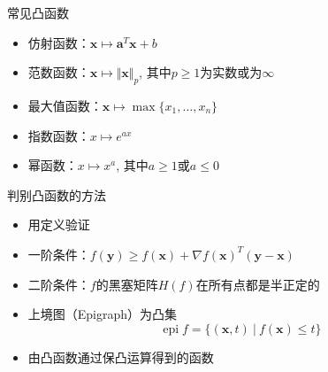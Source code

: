 
\begin{frame}

\begin{block}{常见凸函数}
\begin{itemize}
\item 仿射函数：$\mathbf{x} \mapsto \mathbf{a}^T\mathbf{x} + b$
\item 范数函数：$\mathbf{x} \mapsto \Vert \mathbf{x} \Vert_p$, 其中$p\ge1$为实数或为$\infty$
\item 最大值函数：$\mathbf{x} \mapsto \max\{x_1,\ldots,x_n\}$
\item 指数函数：$x \mapsto e^{ax}$
\item 幂函数：$x \mapsto x^{a}$, 其中$a \ge 1$或$a\le 0$
\end{itemize}
\end{block}

\end{frame}


\begin{frame}

\begin{block}{判别凸函数的方法}
\begin{itemize}
\item 用定义验证
\item 一阶条件：$f(\mathbf{y}) \ge f(\mathbf{x}) + \nabla f(\mathbf{x})^T(\mathbf{y} - \mathbf{x})$
\item 二阶条件：$f$的黑塞矩阵$H(f)$在所有点都是半正定的
\item 上境图（Epigraph）为凸集
$$\operatorname{epi}f = \{ (\mathbf{x}, t) \ |\ f(\mathbf{x}) \le t \}$$
\item 由凸函数通过保凸运算得到的函数
\end{itemize}
\end{block}

\end{frame}


